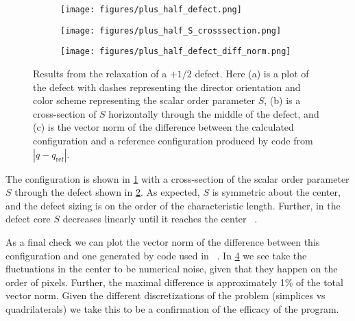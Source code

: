 \documentclass[reqno]{article}
\begin{document}
  \begin{figure}[h]
    \centering
    \begin{subfigure}{0.45\textwidth}
      \texttt{[image: figures/plus\_half\_defect.png]}
      \caption{}
      \label{fig:plus-half-defect}
    \end{subfigure}
    \hfill
    \begin{subfigure}{0.45\textwidth}
      \texttt{[image: figures/plus\_half\_S\_crosssection.png]}
      \caption{}
      \label{fig:plus-half-S-crosssection}
    \end{subfigure}
    \hfill
    \begin{subfigure}{0.45\textwidth}
      \texttt{[image: figures/plus\_half\_defect\_diff\_norm.png]}
      \caption{}
      \label{fig:plus-half-defect-diff-norm}
    \end{subfigure}
    \caption{Results from the relaxation of a $+1/2$ defect. Here (a) is a plot
      of the defect with dashes representing the director orientation and color
      scheme representing the scalar order parameter $S$, (b) is a cross-section
    of $S$ horizontally through the middle of the defect, and (c) is the vector
    norm of the difference between the calculated configuration and a reference
    configuration produced by code from ~\cite{schimming_numerical_2021} $|q - q_\text{ref}|$.}
  \end{figure}

  The configuration is shown in \ref{fig:plus-half-defect} with a cross-section of the
  scalar order parameter $S$ through the defect shown in \ref{fig:plus-half-S-crosssection}.
  As expected, $S$ is symmetric about the center, and the defect sizing is on
  the order of the characteristic length.
  Further, in the defect core $S$ decreases linearly until it reaches the
  center ~\cite{ronning_flow_2021}.
  
  As a final check we can plot the vector norm of the difference between
  this configuration and one generated by code used in ~\cite{schimming_numerical_2021}.
  In \ref{fig:plus-half-defect-diff-norm} we see take the fluctuations in the center to be
  numerical noise, given that they happen on the order of pixels.
  Further, the maximal difference is approximately 1\% of the total vector norm.
  Given the different discretizations of the problem (simplices vs
  quadrilaterals) we take this to be a confirmation of the efficacy of the program.
  
\end{document}
